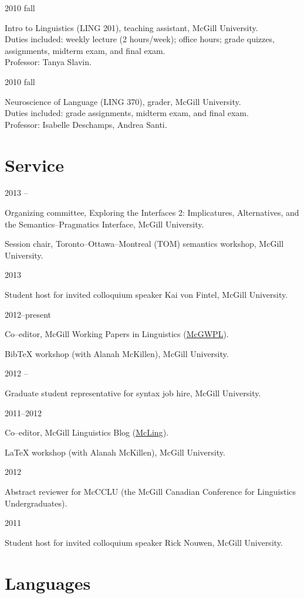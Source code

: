 \documentclass[11pt,letterpaper]{article}
\newcommand{\cvitem}[2]{%
  \begin{minipage}[t]{0.24\textwidth}
    #1 %
  \end{minipage}
  \hfill
  \begin{minipage}[t]{0.74\textwidth}
    #2 %
  \end{minipage}
}
\newcommand{\tadetails}[2]{%
  {\footnotesize Duties included: #1. \\ Professor: #2.}
}
\begin{document}
\cvitem{2010 fall}{Intro to Linguistics (LING 201), teaching assistant, McGill
  University. \\ \tadetails{weekly lecture (2 hours/week); office hours; grade
  quizzes, assignments, midterm exam, and final exam}{Tanya Slavin}}

\cvitem{2010 fall}{Neuroscience of Language (LING 370), grader, McGill
  University. \\ \tadetails{grade assignments, midterm exam, and final
  exam}{Isabelle Deschamps, Andrea Santi}}



\section*{Service}

\cvitem{2013 \shortmonthname[4]--\shortmonthname[5]}{Organizing committee,
Exploring the Interfaces 2: Implicatures, Alternatives, and the
Semantics--Pragmatics Interface, McGill University.}

\cvitem{}{Session chair, Toronto--Ottawa--Montreal
(TOM) semantics workshop, McGill University.}

\cvitem{2013 \shortmonthname[1]}{Student host for invited colloquium speaker
Kai von Fintel, McGill University.}

\cvitem{2012--present}{Co--editor, McGill Working Papers in Linguistics
(\href{http://www.mcgill.ca/mcgwpl/}{McGWPL}).}

\cvitem{}{Bib\TeX{} workshop (with Alanah McKillen),
McGill University.}

\cvitem{2012 \shortmonthname[5]--\shortmonthname[6]}{Graduate student
representative for syntax job hire, McGill University.}

\cvitem{2011--2012}{Co--editor, McGill Linguistics Blog
(\href{https://blogs.mcgill.ca/mcling/}{McLing}).}

\cvitem{}{\LaTeX{} workshop (with Alanah McKillen),
McGill University.}

\cvitem{2012 \shortmonthname[1]}{Abstract reviewer for McCCLU (the McGill
Canadian Conference for Linguistics Undergraduates).}

\cvitem{2011 \shortmonthname[12]}{Student host for invited colloquium speaker
Rick Nouwen, McGill University.}



\section*{Languages}
\end{document}
